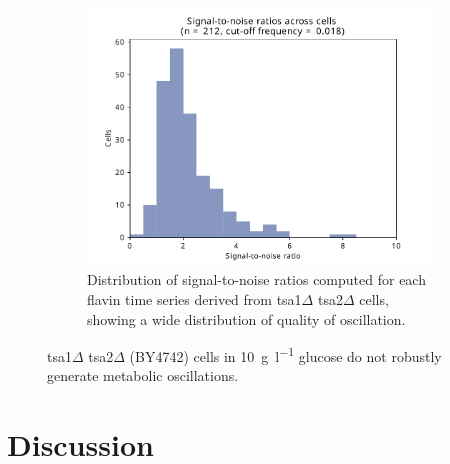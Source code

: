 \begin{figure}
  \begin{subfigure}[t]{0.4\textwidth}
   \centering
   \includegraphics[width=\textwidth]{tsa1tsa2morgan_1649_10.pdf}
   \caption{
    Distribution of signal-to-noise ratios computed for each flavin time series derived from tsa1$\Delta$ tsa2$\Delta$ cells, showing a wide distribution of quality of oscillation.
   }
   \label{fig:biology-tsa1tsa2-snr}
  \end{subfigure}%

  \caption{
    tsa1$\Delta$ tsa2$\Delta$ (BY4742) cells in \SI{10}{\gram~\litre^{-1}} glucose do not robustly generate metabolic oscillations.
  }
  \label{fig:biology-tsa1tsa2}
\end{figure}


\section{Discussion}
\label{sec:biology-discussion}


